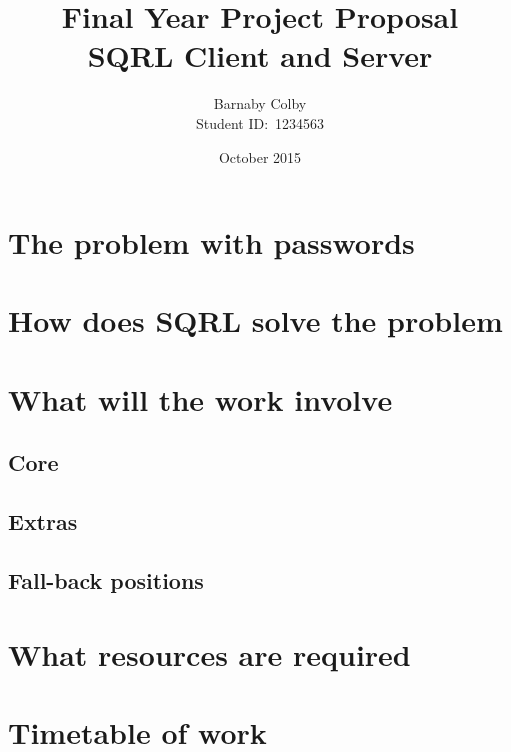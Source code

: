 \documentclass[a4paper]{article}
\begin{document}
\title{Final Year Project Proposal\\SQRL Client and Server}
\author{Barnaby Colby\\
Student ID:\ 1234563}
\date{October 2015}
\maketitle



\section*{The problem with passwords}
\section*{How does SQRL solve the problem}
\section*{What will the work involve}
    \subsection*{Core}
    \subsection*{Extras}
    \subsection*{Fall-back positions}
\section*{What resources are required}
\section*{Timetable of work}
\end{document}
